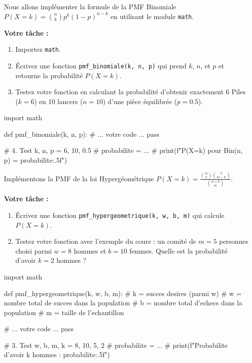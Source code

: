 \begin{exercicebox}
Nous allons implémenter la formule de la PMF Binomiale $P(X=k) = \binom{n}{k} p^k (1-p)^{n-k}$ en utilisant le module \texttt{math}.

\textbf{Votre tâche :}
\begin{enumerate}
    \item Importez \texttt{math}.
    \item Écrivez une fonction \texttt{pmf\_binomiale(k, n, p)} qui prend $k$, $n$, et $p$ et retourne la probabilité $P(X=k)$.
    \item Testez votre fonction en calculant la probabilité d'obtenir exactement 6 Piles ($k=6$) en 10 lancers ($n=10$) d'une pièce équilibrée ($p=0.5$).
\end{enumerate}

\begin{codecell}
import math

def pmf_binomiale(k, n, p):
    # ... votre code ...
    pass

# 4. Test
k, n, p = 6, 10, 0.5
# probabilite = ...
# print(f"P(X={k}) pour Bin({n}, {p}) = {probabilite:.5f}")
\end{codecell}
\end{exercicebox}

\begin{exercicebox}
Implémentons la PMF de la loi Hypergéométrique $P(X=k) = \frac{\binom{w}{k} \binom{b}{m-k}}{\binom{w+b}{m}}$.

\textbf{Votre tâche :}
\begin{enumerate}
    \item Écrivez une fonction \texttt{pmf\_hypergeometrique(k, w, b, m)} qui calcule $P(X=k)$.
    \item Testez votre fonction avec l'exemple du cours : un comité de $m=5$ personnes choisi parmi $w=8$ hommes et $b=10$ femmes. Quelle est la probabilité d'avoir $k=2$ hommes ?
\end{enumerate}

\begin{codecell}
import math

def pmf_hypergeometrique(k, w, b, m):
    # k = succes desires (parmi w)
    # w = nombre total de succes dans la population
    # b = nombre total d'echecs dans la population
    # m = taille de l'echantillon
    
    # ... votre code ...
    pass

# 3. Test
w, b, m, k = 8, 10, 5, 2
# probabilite = ...
# print(f"Probabilite d'avoir {k} hommes : {probabilite:.5f}")
\end{codecell}
\end{exercicebox}

